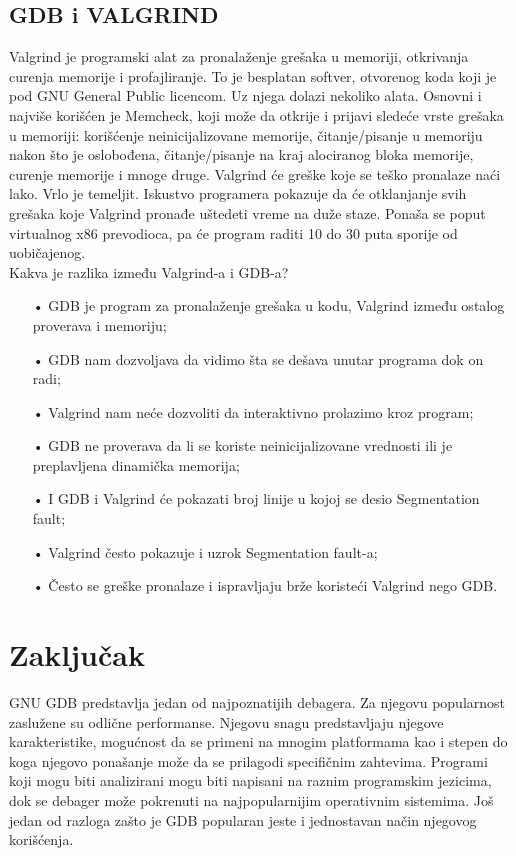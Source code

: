 \documentclass[a4paper]{article}
\begin{document}
\subsection{GDB i VALGRIND}
\label{subsec:valgrind}
Valgrind je programski alat za pronalaženje grešaka u memoriji, otkrivanja curenja memorije i 
profajliranje. To je besplatan softver, otvorenog koda koji je pod GNU General Public licencom. 
Uz njega dolazi nekoliko alata. Osnovni i najviše korišćen je Memcheck, koji može da otkrije i  
prijavi sledeće vrste grešaka u memoriji: korišćenje neinicijalizovane memorije, čitanje/pisanje u 
memoriju nakon što je oslobođena, čitanje/pisanje na kraj alociranog bloka memorije, 
curenje memorije i  mnoge druge. Valgrind će greške koje se teško pronalaze naći lako. Vrlo je 
temeljit. Iskustvo programera pokazuje da će otklanjanje svih grešaka koje Valgrind pronađe 
uštedeti vreme na duže staze. Ponaša se poput virtualnog x86 prevodioca, pa će program raditi 10 
do 30 puta sporije od uobičajenog\cite{valgrind}.\\

Kakva je razlika između Valgrind-a i GDB-a?\cite{valgrind}
\begin{enumerate}
\item[•]GDB je program za pronalaženje grešaka u kodu, Valgrind između ostalog proverava i memoriju;
\item[•]GDB nam dozvoljava da vidimo šta se dešava unutar programa dok on radi;
\item[•]Valgrind nam neće dozvoliti da interaktivno prolazimo kroz program;
\item[•]GDB ne proverava da li se koriste neinicijalizovane vrednosti ili je preplavljena dinamička memorija;
\item[•]I GDB i Valgrind će pokazati broj linije u kojoj se desio Segmentation fault;
\item[•]Valgrind često pokazuje i uzrok  Segmentation fault-a;
\item[•]Često se greške pronalaze i ispravljaju brže koristeći Valgrind nego GDB.
\end{enumerate}

\section{Zaključak}
\label{sec:zakljucak}

GNU GDB predstavlja jedan od najpoznatijih debagera. Za njegovu popularnost zaslužene su odlične performanse. Njegovu snagu predstavljaju 
njegove karakteristike, mogućnost da se primeni na mnogim platformama kao i stepen do koga njegovo ponašanje može da se prilagodi 
specifičnim zahtevima\cite{gnu}. Programi koji mogu biti analizirani mogu biti napisani na raznim programskim jezicima, dok se debager može 
pokrenuti na najpopularnijim operativnim sistemima. Još jedan od razloga zašto je GDB popularan jeste i jednostavan način njegovog 
korišćenja. 
\end{document}
